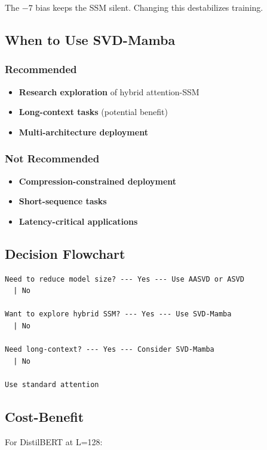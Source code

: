The $-7$ bias keeps the SSM silent. Changing this destabilizes training.

\subsection{When to Use SVD-Mamba}

\subsubsection{Recommended}

\begin{itemize}
\item \textbf{Research exploration} of hybrid attention-SSM
\item \textbf{Long-context tasks} (potential benefit)
\item \textbf{Multi-architecture deployment}

\end{itemize}
\subsubsection{Not Recommended}

\begin{itemize}
\item \textbf{Compression-constrained deployment}
\item \textbf{Short-sequence tasks}
\item \textbf{Latency-critical applications}

\end{itemize}
\subsection{Decision Flowchart}

\begin{lstlisting}
Need to reduce model size? --- Yes --- Use AASVD or ASVD
  | No
   
Want to explore hybrid SSM? --- Yes --- Use SVD-Mamba
  | No
   
Need long-context? --- Yes --- Consider SVD-Mamba
  | No
   
Use standard attention
\end{lstlisting}

\subsection{Cost-Benefit}

For DistilBERT at L=128:

